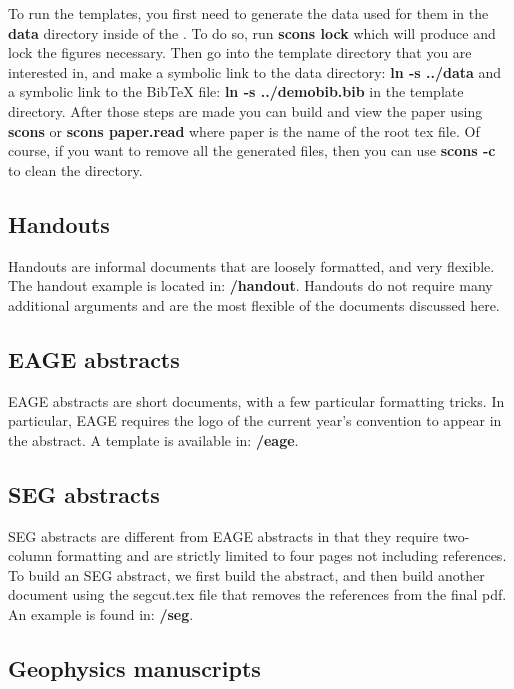 To run the templates, you first need to generate the data used for them in the \textbf{data} directory inside of the \textbf{\exampledir}.  To do so, run \textbf{scons lock} which will produce and lock the figures necessary.  Then go into the template directory that you are interested in, and make a symbolic link to the data directory: \textbf{ln -s ../data} and a symbolic link to the BibTeX file: \textbf{ln -s ../demobib.bib} in the template directory.  After those steps are made you can build and view the paper using \textbf{scons} or \textbf{scons paper.read} where paper is the name of the root tex file.  Of course, if you want to remove all the generated files, then you can use \textbf{scons -c} to clean the directory.

\subsection{Handouts}

Handouts are informal documents that are loosely formatted, and very flexible.  The handout example is located in: \textbf{\exampledir/handout}.  Handouts do not require many additional arguments and are the most flexible of the documents discussed here.

\subsection{EAGE abstracts}

EAGE abstracts are short documents, with a few particular formatting tricks. In particular, EAGE requires the logo of the current year's convention to appear in the abstract.  A template is available in: \textbf{\exampledir/eage}.  

\subsection{SEG abstracts}

SEG abstracts are different from EAGE abstracts in that they require two-column formatting and are strictly limited to four pages not including references.  To build an SEG abstract, we first build the abstract, and then build another document using the segcut.tex file that removes the references from the final pdf.  An example is found in: \textbf{\exampledir/seg}.  

\subsection{Geophysics manuscripts}

